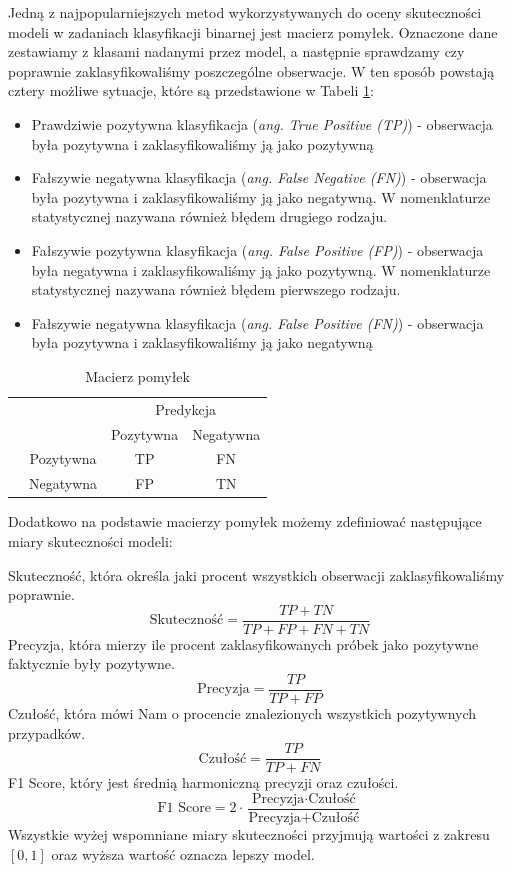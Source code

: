 \documentclass[openany]{book}
\begin{document}
	Jedną z najpopularniejszych metod wykorzystywanych do oceny skuteczności modeli w zadaniach klasyfikacji binarnej jest macierz pomyłek. Oznaczone dane zestawiamy z klasami nadanymi przez model, a następnie sprawdzamy czy poprawnie zaklasyfikowaliśmy poszczególne obserwacje. W ten sposób powstają cztery możliwe sytuacje, które są przedstawione w Tabeli \ref{macierz-pomylek}: 
	\begin{itemize}
		\item Prawdziwie pozytywna klasyfikacja (\textit{ang. True Positive (TP)}) - obserwacja była pozytywna i zaklasyfikowaliśmy ją jako pozytywną
		\item Fałszywie negatywna klasyfikacja (\textit{ang. False Negative (FN)}) - obserwacja była pozytywna i zaklasyfikowaliśmy ją jako negatywną. W nomenklaturze statystycznej nazywana również błędem drugiego rodzaju.
		\item Fałszywie pozytywna klasyfikacja (\textit{ang. False Positive (FP)}) - obserwacja była negatywna i zaklasyfikowaliśmy ją jako pozytywną. W nomenklaturze statystycznej nazywana również błędem pierwszego rodzaju.
		\item Fałszywie negatywna klasyfikacja (\textit{ang. False Positive (FN)}) - obserwacja była pozytywna i zaklasyfikowaliśmy ją jako negatywną
	\end{itemize}
	\begin{table}[h]
		\begin{center}
			\makegapedcells
			\begin{tabular}{cc|cc}
				\multicolumn{2}{c}{}     &   \multicolumn{2}{c}{Predykcja} \\
				&            &   Pozytywna &   Negatywna     \\ 
				\cline{2-4}
				\multirow{2}{*}{\rotatebox[origin=c]{90}{Prawda}} & Pozytywna   & TP         & FN              \\
				& Negatywna   & FP         & TN              \\ 
				\cline{2-4}
			\end{tabular}
		\end{center}
		\caption{Macierz pomyłek}
		\label{macierz-pomylek}
	\end{table}
	
	Dodatkowo na podstawie macierzy pomyłek możemy zdefiniować następujące miary skuteczności modeli:
	
	Skuteczność, która określa jaki procent wszystkich obserwacji zaklasyfikowaliśmy poprawnie.
	$$ \text{Skuteczność} = \frac{TP + TN}{TP + FP + FN + TN} $$
	Precyzja, która mierzy ile procent zaklasyfikowanych próbek jako pozytywne faktycznie były pozytywne.
	$$ \text{Precyzja} = \frac{TP}{TP + FP} $$
	Czułość, która mówi Nam o procencie znalezionych wszystkich pozytywnych przypadków.
	$$ \text{Czułość}= \frac{TP}{TP + FN} $$
	F1 Score, który jest średnią harmoniczną precyzji oraz czułości.
	$$ \text{F1 Score} = 2 \cdot \frac{\text{Precyzja} \cdot \text{Czułość}}{\text{Precyzja} + \text{Czułość}} $$
	Wszystkie wyżej wspomniane miary skuteczności przyjmują wartości z zakresu $[0,1]$ oraz wyższa wartość oznacza lepszy model.
	
\end{document}
